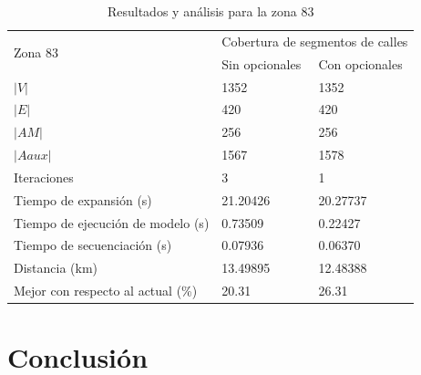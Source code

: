 \documentclass[spanish, conference]{IEEEtran}
\begin{document}
{%
\begin{table}[htbp]
\caption{Resultados y análisis para la zona 83}
\begin{tabular}{lll}
\hline
\multirow{2}{*}{Zona 83}                            & \multicolumn{2}{l}{Cobertura de segmentos de calles} \\ \cline{2-3} 
                                                    & Sin opcionales           & Con opcionales           \\ \hline
$|V|$                                                   & 1352                     & 1352                     \\
$|E|$                                                   & 420                      & 420                      \\
$|AM|$                                                  & 256                      & 256                      \\
$|Aaux|$                                                & 1567                     & 1578                     \\
Iteraciones                                         & 3                        & 1                        \\
Tiempo de expansión (s)                      & 21.20426                 & 20.27737                 \\ 
Tiempo de ejecución de modelo (s)            & 0.73509                  & 0.22427                  \\ 
Tiempo de secuenciación (s)                  & 0.07936                  & 0.06370                  \\ 
Distancia (km)                                      & 13.49895                 & 12.48388                 \\ 
Mejor con respecto al actual (\%) & 20.31                    & 26.31                    \\ \hline
\end{tabular}
\label{table:comparacionZona83}
\end{table}

\section{Conclusión}

}
\end{document}
